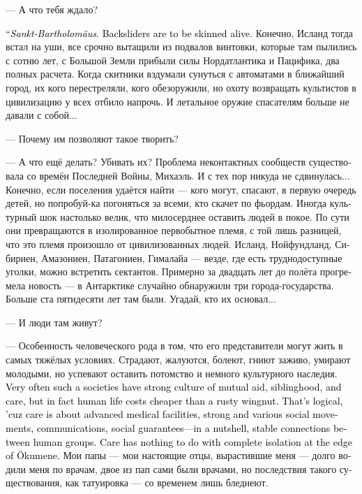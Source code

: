\documentclass[a4paper,12pt,fleqn]{book}\usepackage{cooltooltips}\usepackage{polyglossia}\setdefaultlanguage[babelshorthands=true]{russian}\setotherlanguage{english}\defaultfontfeatures{Ligatures=TeX,Mapping=tex-text} \usepackage{xcolor}\definecolor{lightgray}{HTML}{bbbbbb}\color{lightgray}\newcommand{\ml}[3]{\textenglish{\textcolor{black}{#3}}}
\begin{document}
--- А что тебя ждало?

\ml{$0$}
{--- Святой Варфоломей.}
{``\textit{Sankt-Bartholomäus}.}
\ml{$0$}
{С возвращенцев заживо снимали кожу.}
{Backsliders are to be skinned alive.}
Конечно, Исланд тогда встал на уши, все срочно вытащили из подвалов винтовки, которые там пылились с сотню лет, с Большой Земли прибыли силы Нордатлантика и Пацифика, два полных расчета.
Когда скитники вздумали сунуться с автоматами в ближайший город, их кого перестреляли, кого обезоружили, но охоту возвращать культистов в цивилизацию у всех отбило напрочь.
И летальное оружие спасателям больше не давали с собой...

--- Почему им позволяют такое творить?

--- А что ещё делать?
Убивать их?
Проблема неконтактных сообществ существовала со времён Последней Войны, Михаэль.
И с тех пор никуда не сдвинулась...
Конечно, если поселения удаётся найти --- кого могут, спасают, в первую очередь детей, но попробуй-ка погоняться за всеми, кто скачет по фьордам.
Иногда культурный шок настолько велик, что милосерднее оставить людей в покое.
По сути они превращаются в изолированное первобытное племя, с той лишь разницей, что это племя произошло от цивилизованных людей.
Исланд, Нойфундланд, Сибириен, Амазониен, Патагониен, Гималайа --- везде, где есть труднодоступные уголки, можно встретить сектантов.
Примерно за двадцать лет до полёта прогремела новость --- в Антарктике случайно обнаружили три города-государства.
Больше ста пятидесяти лет там были.
Угадай, кто их основал...

--- И люди там живут?

--- Особенность человеческого рода в том, что его представители могут жить в самых тяжёлых условиях.
Страдают, жалуются, болеют, гниют заживо, умирают молодыми, но успевают оставить потомство и немного культурного наследия.
\ml{$0$}
{Очень часто в таких обществах развита культура взаимопомощи, братства и заботы, но на деле человеческая жизнь там не стоит ржавой гайки.}
{Very often such a societies have strong culture of mutual aid, siblinghood, and care, but in fact human life costs cheaper than a rusty wingnut.}
\ml{$0$}
{Оно и понятно, ведь забота --- это развитая медицина, сильные и разнообразные общественные движения, коммуникации, социальные гарантии --- одним словом, стабильные связи между группами людей.}
{That's logical, 'cuz care is about advanced medical facilities, strong and various social movements, communications, social guarantees---in a nutshell, stable connections between human groups.}
\ml{$0$}
{Забота не имеет ничего общего с полной изоляцией на краю Эйкумене.}
{Care has nothing to do with complete isolation at the edge of Ökumene.}
Мои папы --- мои настоящие отцы, вырастившие меня --- долго водили меня по врачам, двое из пап сами были врачами, но последствия такого существования, как татуировка --- со временем лишь бледнеют.
\end{document}
